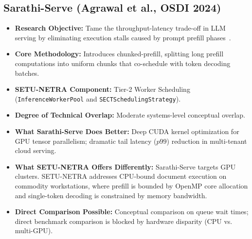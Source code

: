 \documentclass[11pt,a4paper]{article}
\begin{document}
\subsection{Sarathi-Serve (Agrawal et al., OSDI 2024)}
\begin{itemize}[leftmargin=*]
    \item \textbf{Research Objective:} Tame the throughput-latency trade-off in LLM serving by eliminating execution stalls caused by prompt prefill phases~\cite{Agrawal2024Sarathi}.
    \item \textbf{Core Methodology:} Introduces chunked-prefill, splitting long prefill computations into uniform chunks that co-schedule with token decoding batches.
    \item \textbf{SETU-NETRA Component:} Tier-2 Worker Scheduling (\texttt{InferenceWorkerPool} and \texttt{SECTSchedulingStrategy}).
    \item \textbf{Degree of Technical Overlap:} Moderate systems-level conceptual overlap.
    \item \textbf{What Sarathi-Serve Does Better:} Deep CUDA kernel optimization for GPU tensor parallelism; dramatic tail latency ($p99$) reduction in multi-tenant cloud serving.
    \item \textbf{What SETU-NETRA Offers Differently:} Sarathi-Serve targets GPU clusters. SETU-NETRA addresses CPU-bound document execution on commodity workstations, where prefill is bounded by OpenMP core allocation and single-token decoding is constrained by memory bandwidth.
    \item \textbf{Direct Comparison Possible:} Conceptual comparison on queue wait times; direct benchmark comparison is blocked by hardware disparity (CPU vs. multi-GPU).
\end{itemize}

\end{document}
